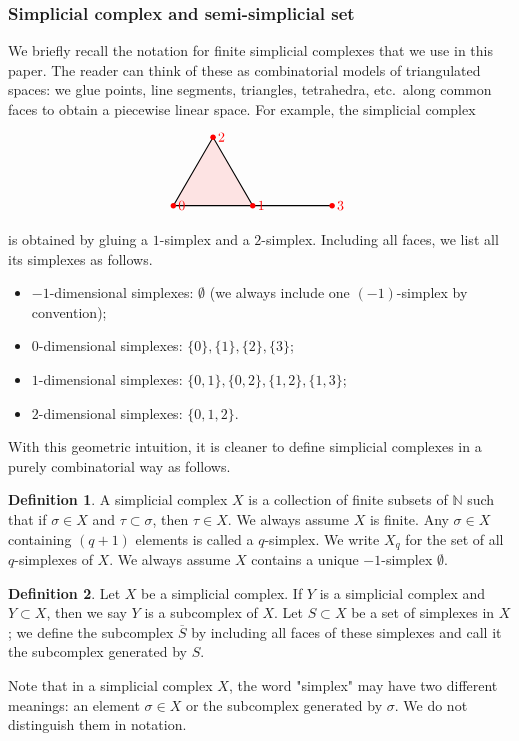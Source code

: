 \documentclass[reprint, amsmath, amssymb, showpacs, floatfix, longbibliography, aps, twocolumn, superscriptaddress, nofootinbib]{revtex4-2}
\newcommand{\NN}{{\mathbb N}}
\theoremstyle{definition}
\newtheorem{definition}{Definition}[section]
\begin{document}
\subsubsection*{Simplicial complex and semi-simplicial set}
We briefly recall the notation for finite simplicial complexes that we use in this paper. 
The reader can think of these as combinatorial models of triangulated spaces: we glue points, line segments, triangles, tetrahedra, etc.\ along common faces to obtain a piecewise linear space. For example, the simplicial complex
\begin{equation}\label{eqSimplicialComplexExample}
	\begin{tikzpicture}
		\centering
		\draw[thick,fill=red,fill opacity=0.1] (0,0) -- (2,0) -- (1,1.732) -- cycle; %
		\draw [thick] (2,0)--(4,0);
		\fill[red] (0,0) circle (2pt);
		\fill[red] (2,0) circle (2pt);
		\fill[red] (4,0) circle (2pt);
		\fill[red] (1,1.732) circle (2pt);
		
		\node[red, right] at (0,0) {0};
		\node[red, right] at (2,0) {1};
		\node[red, right] at (1,1.732) {2};
		\node[red, right] at (4,0) {3};
	\end{tikzpicture}
\end{equation}
is obtained by gluing a $1$-simplex and a $2$-simplex. Including all faces, we list all its simplexes as follows.
\begin{itemize}
	\item $-1$-dimensional simplexes: $\emptyset$ (we always include one $(-1)$-simplex by convention);
	\item $0$-dimensional simplexes: $\{0\},\{1\},\{2\},\{3\}$;
	\item $1$-dimensional simplexes: $\{0,1\},\{0,2\},\{1,2\},\{1,3\}$;
	\item $2$-dimensional simplexes: $\{0,1,2\}$.
\end{itemize}

With this geometric intuition, it is cleaner to define simplicial complexes in a purely combinatorial way as follows.
\begin{definition}
	A  simplicial complex $X$ is a collection of finite subsets of $\NN$
	such that if $\sigma\in X$ and $\tau\subset\sigma$, then $\tau\in X$.  We always assume $X$ is finite. Any $\sigma\in X$ containing $(q+1)$ elements is called a $q$-simplex. We write $X_q$ for the set of all $q$-simplexes of $X$. We always assume $X$ contains a unique $-1$-simplex $\emptyset$.
\end{definition}
\begin{definition}
	Let $X$ be a simplicial complex. If $Y$ is a simplicial complex and $Y\subset X$, then we say $Y$ is a subcomplex of $X$. Let $S\subset X$ be a set of simplexes in $X$; we define the subcomplex $\overline{S}$ by including all faces of these simplexes and call it the subcomplex generated by $S$.
\end{definition}
	Note that in a simplicial complex $X$, the word "simplex" may have two different meanings: an element $\sigma \in X$ or the subcomplex generated by $\sigma$. We do not distinguish them in notation.
\end{document}
